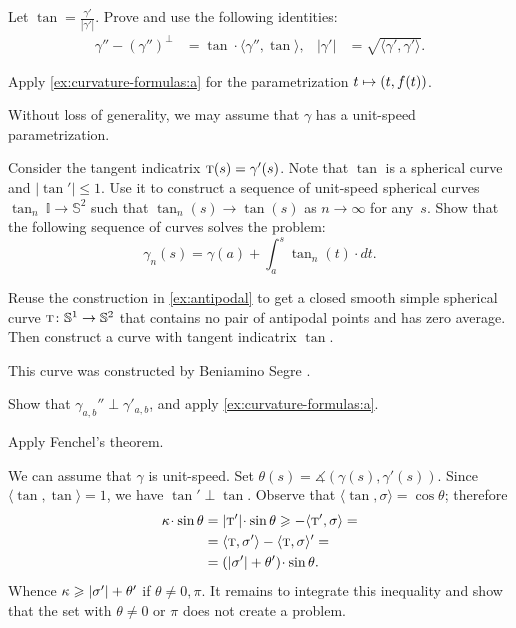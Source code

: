 Let $\tan=\tfrac{\gamma'}{|\gamma'|}$.
Prove and use the following identities: 
\begin{align*}
\gamma''-(\gamma'')^\perp&=\tan\cdot\langle\gamma'',\tan\rangle,
&
|\gamma'|&=\sqrt{\langle \gamma',\gamma'\rangle}.
\end{align*}

Apply \ref{ex:curvature-formulas:a} for the parametrization $t\z\mapsto (t,f(t))$.

Without loss of generality, we may assume that $\gamma$ has a unit-speed parametrization.

Consider the tangent indicatrix $\tan(s)\z=\gamma'(s)$.
Note that $\tan$ is a spherical curve and $|\tan'|\le 1$.
Use it to construct a sequence of unit-speed spherical curves $\tan_n\:\mathbb{I}\to\mathbb{S}^2$ such that $\tan_n(s)\to \tan(s)$ as $n\to\infty$ for any~$s$.
Show that the following sequence of curves solves the problem:
\[\gamma_n(s)=\gamma(a)+\int_a^s\tan_n(t)\cdot dt.\]

Reuse the construction in \ref{ex:antipodal} to get a closed smooth simple spherical curve $\tan\:\mathbb{S}^1\z\to\mathbb{S}^2$ that contains no pair of antipodal points and has zero average.
Then construct a curve with tangent indicatrix $\tan$.

 This curve was constructed by Beniamino Segre \cite{segre}.

Show that $\gamma_{a,b}''\perp \gamma'_{a,b}$, and apply \ref{ex:curvature-formulas:a}.

 Apply Fenchel's theorem.

We can assume that $\gamma$ is unit-speed.
Set $\theta(s)=\measuredangle(\gamma(s),\gamma'(s))$.
Since $\langle\tan,\tan\rangle=1$, we have $\tan'\perp \tan$.
Observe that $\langle \tan,\sigma\rangle=\cos\theta$;
therefore
\begin{align*}
\kur\cdot \sin\theta
&=|\tan'|\cdot \sin\theta\ge
-\langle \tan',\sigma\rangle=
\\
&=
\langle \tan,\sigma'\rangle-\langle \tan,\sigma\rangle'=
\\
&=
(|\sigma'|+\theta')\cdot \sin\theta.
\end{align*}
Whence $\kappa\geqslant |\sigma'|+\theta'$
if $\theta\ne0,\pi$.
It remains to integrate this inequality and show that the set with $\theta\ne0$ or $\pi$ does not create a problem.

